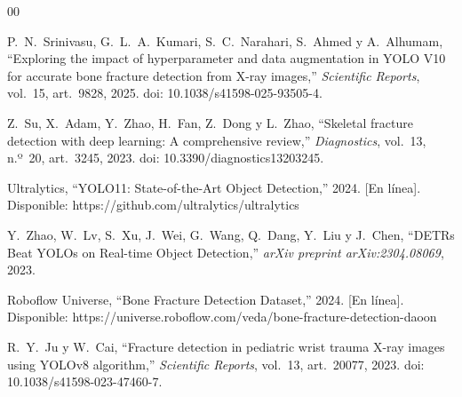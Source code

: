 \documentclass[conference]{IEEEtran}
\begin{document}
\begin{thebibliography}{00}

P.~N.~Srinivasu, G.~L.~A.~Kumari, S.~C.~Narahari, S.~Ahmed y A.~Alhumam,
``Exploring the impact of hyperparameter and data augmentation in YOLO V10 for
accurate bone fracture detection from X-ray images,''
\textit{Scientific Reports}, vol.~15, art.~9828, 2025.
doi: 10.1038/s41598-025-93505-4.

Z.~Su, X.~Adam, Y.~Zhao, H.~Fan, Z.~Dong y L.~Zhao,
``Skeletal fracture detection with deep learning: A comprehensive review,''
\textit{Diagnostics}, vol.~13, n.º~20, art.~3245, 2023.
doi: 10.3390/diagnostics13203245.

Ultralytics, ``YOLO11: State-of-the-Art Object Detection,'' 2024.
[En línea]. Disponible: https://github.com/ultralytics/ultralytics

Y.~Zhao, W.~Lv, S.~Xu, J.~Wei, G.~Wang, Q.~Dang, Y.~Liu y J.~Chen,
``DETRs Beat YOLOs on Real-time Object Detection,''
\textit{arXiv preprint arXiv:2304.08069}, 2023.

Roboflow Universe, ``Bone Fracture Detection Dataset,'' 2024.
[En línea]. Disponible: https://universe.roboflow.com/veda/bone-fracture-detection-daoon

R.~Y.~Ju y W.~Cai,
``Fracture detection in pediatric wrist trauma X-ray images using YOLOv8 algorithm,''
\textit{Scientific Reports}, vol.~13, art.~20077, 2023.
doi: 10.1038/s41598-023-47460-7.

\end{thebibliography}
\end{document}

